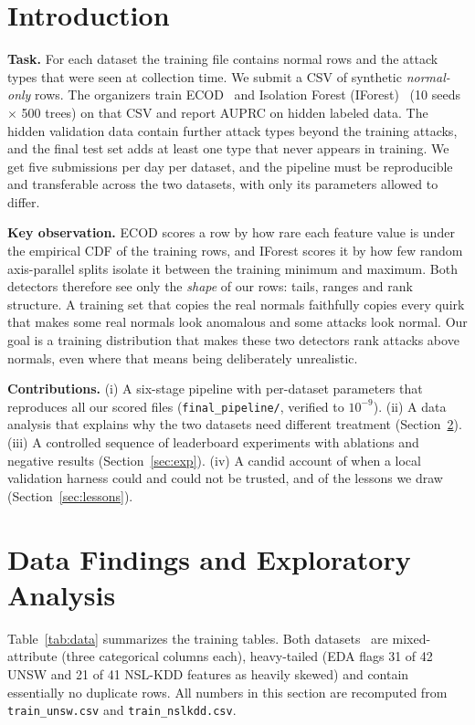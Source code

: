 \documentclass[10pt,a4paper]{article}
\begin{document}
\section{Introduction}
\textbf{Task.} For each dataset the training file contains normal rows and the attack types that were seen at collection time. We submit a CSV of synthetic \emph{normal-only} rows. The organizers train ECOD~\cite{ecod} and Isolation Forest (IForest)~\cite{iforest} (10 seeds $\times$ 500 trees) on that CSV and report AUPRC on hidden labeled data. The hidden validation data contain further attack types beyond the training attacks, and the final test set adds at least one type that never appears in training. We get five submissions per day per dataset, and the pipeline must be reproducible and transferable across the two datasets, with only its parameters allowed to differ.

\textbf{Key observation.} ECOD scores a row by how rare each feature value is under the empirical CDF of the training rows, and IForest scores it by how few random axis-parallel splits isolate it between the training minimum and maximum. Both detectors therefore see only the \emph{shape} of our rows: tails, ranges and rank structure. A training set that copies the real normals faithfully copies every quirk that makes some real normals look anomalous and some attacks look normal. Our goal is a training distribution that makes these two detectors rank attacks above normals, even where that means being deliberately unrealistic.

\textbf{Contributions.} (i) A six-stage pipeline with per-dataset parameters that reproduces all our scored files (\texttt{final\_pipeline/}, verified to $10^{-9}$). (ii) A data analysis that explains why the two datasets need different treatment (Section~\ref{sec:eda}). (iii) A controlled sequence of leaderboard experiments with ablations and negative results (Section~\ref{sec:exp}). (iv) A candid account of when a local validation harness could and could not be trusted, and of the lessons we draw (Section~\ref{sec:lessons}).

\section{Data Findings and Exploratory Analysis}\label{sec:eda}
Table~\ref{tab:data} summarizes the training tables. Both datasets~\cite{nsl,unsw} are mixed-attribute (three categorical columns each), heavy-tailed (EDA flags 31 of 42 UNSW and 21 of 41 NSL-KDD features as heavily skewed) and contain essentially no duplicate rows. All numbers in this section are recomputed from \texttt{train\_unsw.csv} and \texttt{train\_nslkdd.csv}.
\end{document}
